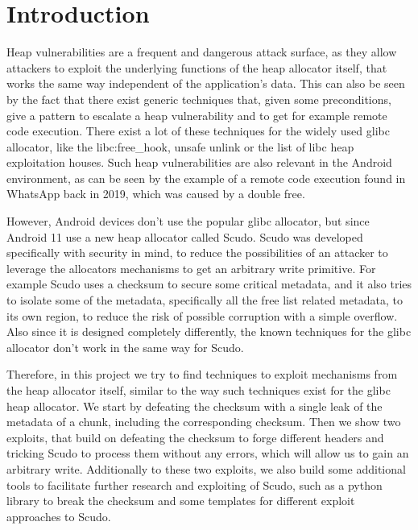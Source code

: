 \documentclass[a4paper,11pt,oneside]{report}
\begin{document}
\maketoc{}

\chapter{Introduction}

Heap vulnerabilities are a frequent and dangerous attack surface, as they allow attackers
to exploit the underlying functions of the heap allocator itself, that works the same way
independent of the application's data. This can also be seen by the fact that there exist
generic techniques that, given some preconditions, give a pattern to escalate a heap
vulnerability and to get for example remote code execution. There exist a lot of these
techniques for the widely used glibc allocator, like the libc:free\_hook, unsafe unlink or
the list of libc heap exploitation houses. Such heap vulnerabilities are also relevant in
the Android environment, as can be seen by the example of a remote code execution found in
WhatsApp back in 2019, which was caused by a double free.~\cite{whatsappRCE}

However, Android devices don't use the popular glibc allocator, but since Android 11 use a
new heap allocator called Scudo. Scudo was developed specifically with security in mind,
to reduce the possibilities of an attacker to leverage the allocators mechanisms to get an
arbitrary write primitive. For example Scudo uses a checksum to secure some critical
metadata, and it also tries to isolate some of the metadata, specifically all the free list
related metadata, to its own region, to reduce the risk of possible corruption with a
simple overflow. Also since it is designed completely differently, the known techniques
for the glibc allocator don't work in the same way for Scudo.~\cite{llvmScudo}

Therefore, in this project we try to find techniques to exploit mechanisms from the heap
allocator itself, similar to the way such techniques exist for the glibc heap
allocator. We start by defeating the checksum with a single leak of the metadata of a
chunk, including the corresponding checksum. Then we show two exploits, that build on
defeating the checksum to forge different headers and tricking Scudo to process them
without any errors, which will allow us to gain an arbitrary write. Additionally to these
two exploits, we also build some additional tools to facilitate further research and
exploiting of Scudo, such as a python library to break the checksum and some templates for
different exploit approaches to Scudo.
\end{document}
